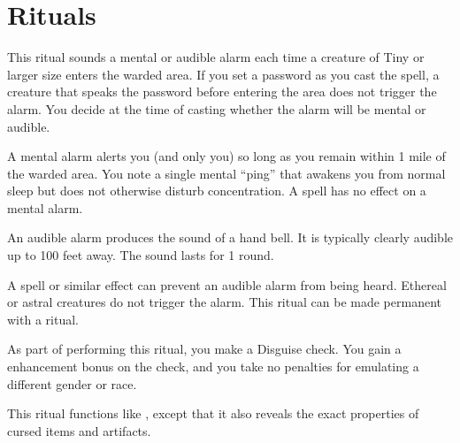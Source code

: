 \section{Rituals}

\spellrng{\rngclose}
\begin{spelleffect}
    This ritual sounds a mental or audible alarm each time a creature of Tiny or larger size enters the warded area. If you set a password as you cast the spell, a creature that speaks the password before entering the area does not trigger the alarm. You decide at the time of casting whether the alarm will be mental or audible.
\par {} A mental alarm alerts you (and only you) so long as you remain within 1 mile of the warded area. You note a single mental ``ping'' that awakens you from normal sleep but does not otherwise disturb concentration. A  spell has no effect on a mental alarm.
\par {} An audible alarm produces the sound of a hand bell. It is typically clearly audible up to 100 feet away. The sound lasts for 1 round. 
\end{spelleffect}
\begin{spellnotes}
    A  spell or similar effect can prevent an audible alarm from being heard. Ethereal or astral creatures do not trigger the alarm. This ritual can be made permanent with a  ritual.
\end{spellnotes}

\spelldur{\durlong}
\begin{spelleffect}
    As part of performing this ritual, you make a Disguise check. You gain a  enhancement bonus on the check, and you take no penalties for emulating a different gender or race.
\end{spelleffect}

\begin{spelleffect}
    This ritual functions like , except that it also reveals the exact properties of cursed items and artifacts.
\end{spelleffect}

